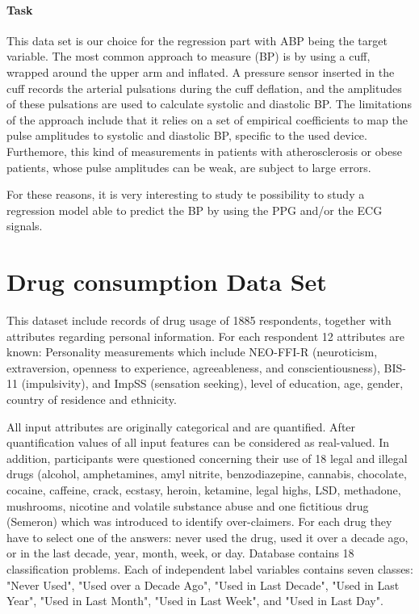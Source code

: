 \documentclass{article}
\begin{document}
\paragraph{Task}
\noindent This data set is our choice for the regression part with ABP being the target variable. 
The most common approach to measure (BP) is by using a cuff, wrapped around the upper arm and inflated. A pressure sensor inserted in the cuff records the arterial pulsations during the cuff deflation, and the amplitudes of these pulsations are used to calculate systolic and diastolic BP. The limitations of the approach include that it relies on a set of empirical coefficients to map the pulse amplitudes to systolic and diastolic BP, specific to the used device. Furthemore, this kind of measurements in patients with atherosclerosis or obese patients, whose pulse amplitudes can be weak, are subject to large errors.

For these reasons, it is very interesting to study te possibility to study a regression model able to predict the BP by using the PPG and/or the ECG signals.





\section{Drug consumption Data Set}
This dataset \cite{fehrman2017factor} include records of drug usage of 1885 respondents, together with attributes regarding personal information. For each respondent 12 attributes are known: Personality measurements which include NEO-FFI-R (neuroticism, extraversion, openness to experience, agreeableness, and conscientiousness), BIS-11 (impulsivity), and ImpSS (sensation seeking), level of education, age, gender, country of residence and ethnicity. 

All input attributes are originally categorical and are quantified. After quantification values of all input features can be considered as real-valued. In addition, participants were questioned concerning their use of 18 legal and illegal drugs (alcohol, amphetamines, amyl nitrite, benzodiazepine, cannabis, chocolate, cocaine, caffeine, crack, ecstasy, heroin, ketamine, legal highs, LSD, methadone, mushrooms, nicotine and volatile substance abuse and one fictitious drug (Semeron) which was introduced to identify over-claimers. For each drug they have to select one of the answers: never used the drug, used it over a decade ago, or in the last decade, year, month, week, or day.
Database contains 18 classification problems. Each of independent label variables contains seven classes: "Never Used", "Used over a Decade Ago", "Used in Last Decade", "Used in Last Year", "Used in Last Month", "Used in Last Week", and "Used in Last Day".
\end{document}
